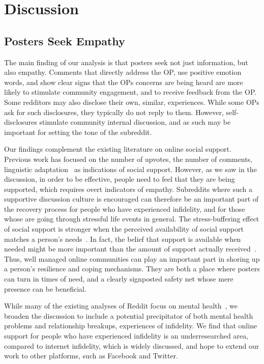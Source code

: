 \section{Discussion}
\subsection{Posters Seek Empathy}


The main finding of our analysis is that posters seek not just information, but also empathy. Comments that directly address the OP, use positive emotion words, and show clear signs that the OPs concerns are being heard are more likely to stimulate community engagement, and to receive feedback from the OP. 
Some redditors may also disclose their own, similar, experiences. While some OPs ask for such disclosures, they typically do not reply to them. However, self-disclosures stimulate community internal discussion, and as such may be important for setting the tone of the subreddit. 

Our findings complement the existing literature on online social support. Previous work has focused on the number of upvotes, the number of comments, linguistic adaptation~\cite{balani2015detecting,Sharma2018support} as indications of social support. However, as we saw in the discussion, in order to be effective, people need to feel that they are being supported, which requires overt indicators of empathy. Subreddits where such a supportive discussion culture is encouraged can therefore be an important part of the recovery process for people who have experienced infidelity, and for those whose are going through stressful life events in general. The stress-buffering effect of social support is stronger when the perceived availability of social support matches a person's needs~\cite{holahan1981social, cutrona1990type}. In fact, the belief that support is available when needed might be more important than the amount of support actually received~\cite{wethington1986perceived}. Thus, well managed online communities can play an important part in shoring up a person's resilience and coping mechanisms. They are both a place where posters can turn in times of need, and a clearly signposted safety net whose mere presence can be beneficial. 

While many of the existing analyses of Reddit focus on mental health~\cite{de2014characterizing,Sharma2018support}, we broaden the discussion to include a potential precipitator of both mental health problems and relationship breakups, experiences of infidelity. We find that online support for people who have experienced infidelity is an underresearched area, compared to internet infidelity, which is widely discussed, and hope to extend our work to other platforms, such as Facebook and Twitter.

